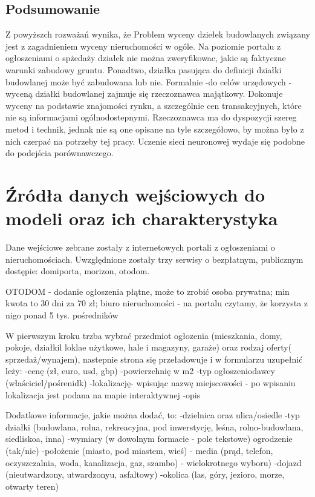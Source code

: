 \documentclass[a4paper,12pt,twoside,openany]{report}
\begin{document}
\section{Podsumowanie}

Z powyższch rozważań wynika, że 
Problem wyceny dziełek budowlanych związany jest z zagadnieniem wyceny nieruchomości w ogóle. 
Na poziomie portalu z ogłoszeniami o spżedaży działek nie można zweryfikowac, jakie są faktyczne warunki zabudowy gruntu.
Ponadtwo, działka pasująca do definicji działki budowlanej może być zabudowana lub nie.
Formalnie -do celów urzędowych - wyceną działki budowlanej zajmuje się rzeczoznawca majątkowy. Dokonuje wyceny na podstawie znajomości rynku, a szczególnie cen transakcyjnych, które nie są informacjami ogólnodostepnymi. Rzeczoznawca ma do dyspozycji szereg metod i technik, jednak nie są one opisane na tyle szczegółowo, by można było z nich czerpać na potrzeby tej pracy.
Uczenie sieci neuronowej wydaje się podobne do podejścia porównawczego.




\chapter{Źródła danych wejściowych do modeli oraz ich charakterystyka}
 



Dane wejściowe zebrane zostały z internetowych portali z ogłoszeniami o nieruchomościach. Uwzględnione zostały trzy serwisy o bezpłatnym, publicznym dostępie: domiporta, morizon, otodom.


OTODOM - dodanie ogłoszenia płątne, może to zrobić osoba prywatna; min kwota to 30 dni za 70 zł; biuro nieruchomości - na portalu czytamy, że korzysta z nigo ponad 5 tys. pośredników \cite{otodom_o_nas}

W pierwszym kroku trzba wybrać przedmiot ogłozenia (mieszkania, domy, pokoje, działkil loklae użytkowe, hale i magazyny, garaże) oraz rodzaj oferty( sprzedaż/wynajem), nastepnie strona się przeładowuje i w formularzu uzupełnić leży:
-cenę (zł, euro, usd, gbp)
-powierzchnię w m2
-typ ogłoszeniodawcy (właściciel/pośrenidk)
-lokalizację- wpisując nazwę miejscowości - po wpisaniu lokalizacja jest podana na mapie interaktywnej
-opis

Dodatkowe informacje, jakie można dodać, to:
-dzielnica oraz ulica/osiedle
-typ działki (budowlana, rolna, rekreacyjna, pod inwerstycję, leśna, rolno-budowlana, siedliskoa, inna)
-wymiary (w dowolnym formacie - pole tekstowe)
ogrodzenie (tak/nie)
-położenie (miasto, pod miastem, wieś)
- media (prąd, telefon, oczyszczalnia, woda, kanalizacja, gaz, szambo) - wielokrotnego wyboru)
-dojazd (nieutwardzony, utwardzonyu, asfaltowy)
-okolica (las, góry, jezioro, morze, otwarty teren)
\end{document}
